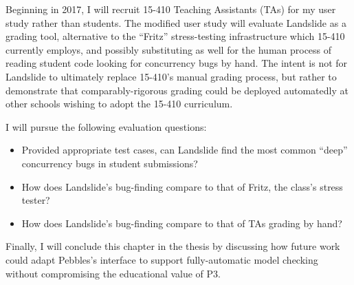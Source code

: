 Beginning in 2017, I will recruit 15-410 Teaching Assistants (TAs) for my user study rather than students.
The modified user study will evaluate Landslide as a grading tool,
alternative to the ``Fritz'' stress-testing infrastructure which 15-410 currently employs,
and possibly substituting as well for the human process of reading student code looking for concurrency bugs by hand.
The intent is not for Landslide to ultimately replace 15-410's manual grading process,
but rather to demonstrate that comparably-rigorous grading could be deployed automatedly at other schools wishing to adopt the 15-410 curriculum.

I will pursue the following evaluation questions:

\begin{itemize}
	\item Provided appropriate test cases, can Landslide find the most common ``deep'' concurrency bugs in student submissions?
	\item How does Landslide's bug-finding compare to that of Fritz, the class's stress tester?
	\item How does Landslide's bug-finding compare to that of TAs grading by hand?
\end{itemize}

Finally, I will conclude this chapter in the thesis by discussing how future work could adapt Pebbles's interface to support fully-automatic model checking without compromising the educational value of P3.

